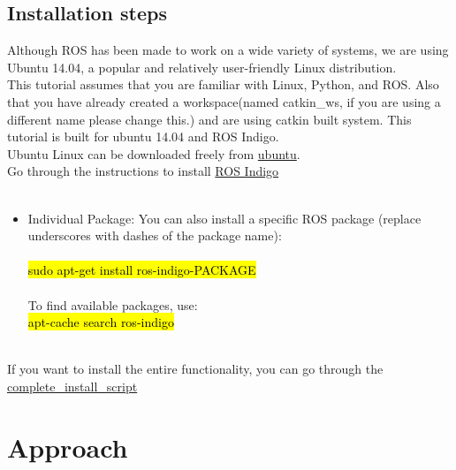 \documentclass[a4paper,12pt,oneside]{book}
\begin{document}
  \section{Installation steps}
  \hspace*{0.3in} Although ROS has been made to work on a wide variety of systems, we are using Ubuntu 14.04, a popular and relatively user-friendly Linux distribution.\\
  \hspace*{1in} This tutorial assumes that you are familiar with Linux, Python, and ROS. Also that you have already created a workspace(named catkin\_ws, if you are using a different name please change this.) and are using catkin built system. This tutorial is built for ubuntu 14.04 and ROS Indigo. \\ Ubuntu Linux can be downloaded freely from \href{http://ubuntu.com}{ubuntu}. \\
  Go through the instructions to install \href{http://wiki.ros.org/indigo/Installation/Ubuntu}{ROS Indigo}\\\
  
\begin{itemize}
\item Individual Package: You can also install a specific ROS package (replace underscores with dashes of the package name):\\\\
 \hl {sudo apt-get install ros-indigo-PACKAGE}\\\\
 To find available packages, use:\\
 \hl {apt-cache search ros-indigo}\\\\
\end{itemize}
  
If you want to install the entire functionality, you can go through the  \href{https://github.com/eYSIP-2017/eYSIP-2017_Navigation-in-Indoor-Environments-using-drone/blob/master/install_scripts/complete_install.sh}{complete\_install\_script}  
   


\pagebreak

\chapter[Approach]{Approach}
\end{document}
